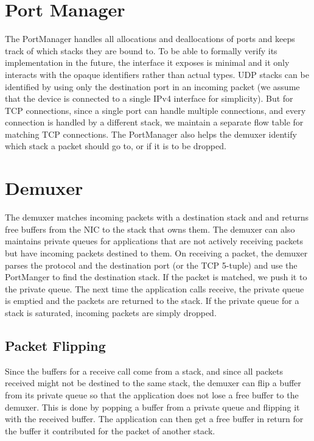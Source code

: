 \section{Port Manager}
The PortManager handles all allocations and deallocations of ports and keeps track of which stacks they are bound to. To be able to formally verify its implementation in the future, the interface it exposes is minimal and it only interacts with the opaque identifiers rather than actual types. 
UDP stacks can be identified by using only the destination port in an incoming packet (we assume that the device is connected to a single IPv4 interface for simplicity). But for TCP connections, since a single port can handle multiple connections, and every connection is handled by a different stack, we maintain a separate flow table for matching TCP connections.
The PortManager also helps the demuxer identify which stack a packet should go to, or if it is to be dropped.

\section{Demuxer}
The demuxer matches incoming packets with a destination stack and and returns free buffers from the NIC to the stack that owns them. The demuxer can also maintains private queues for applications that are not actively receiving packets but have incoming packets destined to them. 
On receiving a packet, the demuxer parses the protocol and the destination port (or the TCP 5-tuple) and use the PortManger to find the destination stack. If the packet is matched, we push it to the private queue. The next time the application calls receive, the private queue is emptied and the packets are returned to the stack. If the private queue for a stack is saturated, incoming packets are simply dropped.

\subsection{Packet Flipping}
Since the buffers for a receive call come from a stack, and since all packets received might not be destined to the same stack, the demuxer can flip a buffer from its private queue so that the application does not lose a free buffer to the demuxer. This is done by popping a buffer from a private queue and flipping it with the received buffer. The application can then get a free buffer in return for the buffer it contributed for the packet of another stack.

